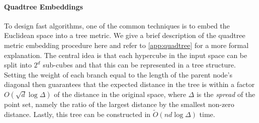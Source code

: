 \paragraph*{Quadtree Embeddings}

To design fast algorithms, one of the common techniques is to embed the Euclidean space into a tree metric.  We give a brief description of the quadtree metric
embedding procedure here and refer to \cref{app:quadtree} for a more formal explanation.  The central idea is that each hypercube in the input space can be
split into $2^d$ sub-cubes and that this can be represented in a tree structure. Setting the weight of each branch equal to the length of the parent node's
diagonal then guarantees that the expected distance in the tree is within a factor $O(\sqrt{d} \log \Delta)$ of the distance in the original space, where
$\Delta$ is the \emph{spread} of the point set, namely the ratio of the largest distance by the smallest non-zero distance. Lastly, this tree can be constructed
in $\tilde{O}(nd \log \Delta)$ time.
